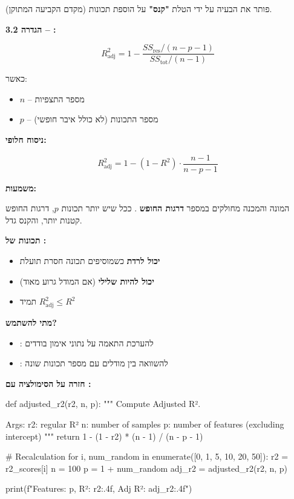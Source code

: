 \textbf{} (מקדם הקביעה המתוקן) פותר את הבעיה על ידי הטלת \textbf{"קנס"} על הוספת תכונות.

\textbf{הגדרה \num{3.2} – :}

\begin{equation}
R^2_{\text{adj}} = 1 - \frac{SS_{\text{res}} / (n - p - 1)}{SS_{\text{tot}} / (n - 1)}
\end{equation}

כאשר:
\begin{itemize}
\item $n$ – מספר התצפיות
\item $p$ – מספר התכונות (לא כולל איבר חופשי)
\end{itemize}

\textbf{ניסוח חלופי:}

\begin{equation}
R^2_{\text{adj}} = 1 - (1 - R^2) \cdot \frac{n - 1}{n - p - 1}
\end{equation}

\textbf{משמעות:}

המונה והמכנה מחולקים במספר \textbf{דרגות החופש} . ככל שיש יותר תכונות $p$, דרגות החופש קטנות יותר, והקנס גדל.

\textbf{תכונות של :}

\begin{itemize}
\item \textbf{יכול לרדת} כשמוסיפים תכונה חסרת תועלת
\item \textbf{יכול להיות שלילי} (אם המודל גרוע מאוד)
\item תמיד $R^2_{\text{adj}} \leq R^2$
\end{itemize}

\textbf{מתי להשתמש?}

\begin{itemize}
\item \textbf{\Rsquared{}}: להערכת התאמה על נתוני אימון בודדים
\item \textbf{}: להשוואה בין מודלים עם מספר תכונות שונה
\end{itemize}

\textbf{חזרה על הסימולציה עם :}

\begin{pythonbox*}
def adjusted_r2(r2, n, p):
    """
    Compute Adjusted R².

    Args:
        r2: regular R²
        n: number of samples
        p: number of features (excluding intercept)
    """
    return 1 - (1 - r2) * (n - 1) / (n - p - 1)

# Recalculation
for i, num_random in enumerate([0, 1, 5, 10, 20, 50]):
    r2 = r2_scores[i]
    n = 100
    p = 1 + num_random
    adj_r2 = adjusted_r2(r2, n, p)

    print(f"Features: {p}, R²: {r2:.4f}, Adj R²: {adj_r2:.4f}")
\end{pythonbox*}

